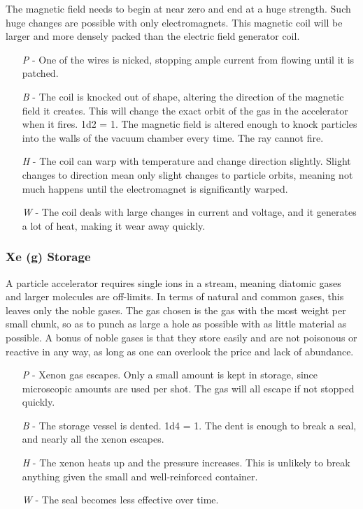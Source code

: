 \documentclass[a4paper]{article}
\begin{document}
The magnetic field needs to begin at near zero and end at a huge strength. Such huge changes are possible with only electromagnets. This magnetic coil will be larger and more densely packed than the electric field generator coil. 
\begin{enumerate}
\item [\textit{P}] - One of the wires is nicked, stopping ample current from flowing until it is patched.
\item [\textit{B}] - The coil is knocked out of shape, altering the direction of the magnetic field it creates. This will change the exact orbit of the gas in the accelerator when it fires. \newline \hspace*{-3pt} 1d2 = 1. The magnetic field is altered enough to knock particles into the walls of the vacuum chamber every time. The ray cannot fire.
\item [\textit{H}] - The coil can warp with temperature and change direction slightly. Slight changes to direction mean only slight changes to particle orbits, meaning not much happens until the electromagnet is significantly warped.
\item [\textit{W}] - The coil deals with large changes in current and voltage, and it generates a lot of heat, making it wear away quickly.
\end{enumerate}

\vspace{-0.5cm} \hspace{-18pt} \subsubsection{Xe (g) Storage} \label{ray_xe_storage} \vspace{-0.2cm}
A particle accelerator requires single ions in a stream, meaning diatomic gases and larger molecules are off-limits. In terms of natural and common gases, this leaves only the noble gases. The gas chosen is the gas with the most weight per small chunk, so as to punch as large a hole as possible with as little material as possible. A bonus of noble gases is that they store easily and are not poisonous or reactive in any way, as long as one can overlook the price and lack of abundance.
\begin{enumerate}
\item [\textit{P}] - Xenon gas escapes. Only a small amount is kept in storage, since microscopic amounts are used per shot. The gas will all escape if not stopped quickly.
\item [\textit{B}] - The storage vessel is dented. \newline \hspace{3pt} 1d4 = 1. The dent is enough to break a seal, and nearly all the xenon escapes.
\item [\textit{H}] - The xenon heats up and the pressure increases. This is unlikely to break anything given the small and well-reinforced container.
\item [\textit{W}] - The seal becomes less effective over time.
\end{enumerate}
\end{document}
